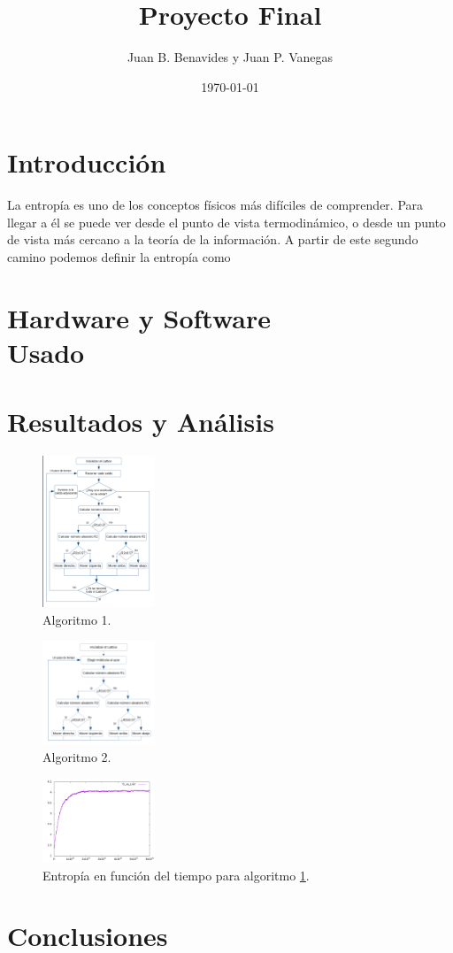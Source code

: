 \documentclass[12pt,twocolumn]{article}
\title{Proyecto Final}
\author{Juan B. Benavides y Juan P. Vanegas }
\date{\today}
\begin{document}
\maketitle

\section{\label{sec: Intro} Introducción}
La entropía es uno de los conceptos físicos más difíciles de comprender. Para llegar a 
él se puede ver desde el punto de vista termodinámico, o desde un punto de vista más 
cercano a la teoría de la información. A partir de este segundo camino podemos definir la 
entropía como 

\section{Hardware y Software \\ Usado}

\section{Resultados y Análisis}
\begin{figure}
    \centering
    \includegraphics[width=0.3\textwidth]{figs/Algoritmo_OOP.png}
    \caption{Algoritmo 1.}
    \label{fig:algoritmo_OOP}
\end{figure}

\begin{figure}
    \centering
    \includegraphics[width=0.3\textwidth]{figs/Algoritmo_Funcional.png}
    \caption{Algoritmo 2.}
    \label{fig:algoritmo_Fun}
\end{figure}

\begin{figure}
    \centering
    \includegraphics[width=0.3\textwidth]{figs/S_vs_t_OOP_all.png}
    \caption{Entropía en función del tiempo para algoritmo \ref{fig:algoritmo_OOP}.}
    \label{fig:s_vs_t}
\end{figure}


\section{Conclusiones}
\end{document}
